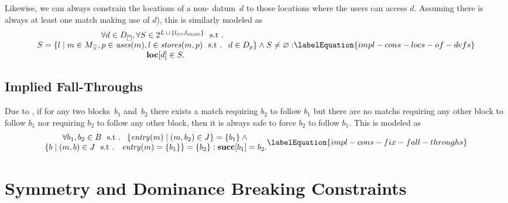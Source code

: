 Likewise, we can always constrain the \glspl{location} of a non- \gls{datum}~$d$ to those \glspl{location} where the users can access
$d$\hspace{-.8pt}.
%
Assuming there is always at least one \gls{match} making use of $d$), this is
similarly modeled as
%
\begin{equation}
  \begin{array}{@{}c@{}}
    \forall d \in \mStateDataCompSet,
    \forall S \in
      \mPowerset{\mLocationSet
      \, \cup \,
      \mSet{\mIntLocation, \mKilledLocation}} \text{ \st} \\
    S = \mSetBuilder{l}%
                    {%
                      m \in \mKillMatchCompSet,
                      p \in \mUses(m),
                      l \in \mStores(m, p)
                      \text{ \st }
                      d \in \mDataSet[p]
                    }
    \mAnd
    S \neq \mEmptySet : \\
    \mVar{loc}[d] \in S.
  \end{array}
  \labelEquation{impl-cons-locs-of-defs}
\end{equation}


\subsection{Implied Fall-Throughs}

Due to , if for any two \glspl{block}~$b_1$ and~$b_2$
there exists a \gls{match} requiring $b_2$ to follow $b_1$ but there are no
\glspl{match} requiring any other \gls{block} to follow $b_1$ nor requiring
$b_2$ to follow any other \gls{block}, then it is always safe to force $b_2$ to
follow $b_1$.
%
This is modeled as
%
\begin{equation}
  \begin{array}{@{}c@{}}
    \forall b_1, b_2 \in \mBlockSet
    \text{ \st }
    \mSetBuilder{\mEntry(m)}{\mPair{m}{b_2} \in \mFallThroughSet} = \mSet{b_1}
    \mAnd \mbox{} \\
    \mSetBuilder{b}%
                {%
                  \mPair{m}{b} \in \mFallThroughSet
                  \text{ \st }
                  \mEntry(m) = \mSet{b_1}%
                } = \mSet{b_2} :
    \mVar{succ}[b_1] = b_2.
  \end{array}
  \labelEquation{impl-cons-fix-fall-throughs}
\end{equation}


\section{Symmetry and Dominance Breaking Constraints}

